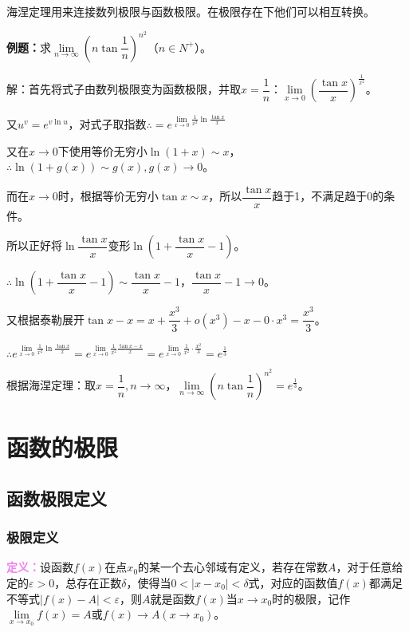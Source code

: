\documentclass[UTF8, 12pt]{ctexart}
\begin{document}
海涅定理用来连接数列极限与函数极限。在极限存在下他们可以相互转换。

\textbf{例题：}求$\lim\limits_{n\to\infty}\left(n\tan\dfrac{1}{n}\right)^{n^2}$（$n\in N^+$）。

解：首先将式子由数列极限变为函数极限，并取$x=\dfrac{1}{n}$：$\lim\limits_{x\to 0}\left(\dfrac{\tan x}{x}\right)^{\frac{1}{x^2}}$。

又$u^v=e^{v\ln u}$，对式子取指数$\therefore =e^{\lim\limits_{x\to 0}\frac{1}{x^2}\ln\frac{\tan x}{x}}$

又在$x\to 0$下使用等价无穷小$\ln (1+x)\sim x$，$\therefore \ln(1+g(x))\sim g(x),g(x)\to 0$。

而在$x\to 0$时，根据等价无穷小$\tan x\sim x$，所以$\dfrac{\tan x}{x}$趋于1，不满足趋于0的条件。

所以正好将$\ln\dfrac{\tan x}{x}$变形$\ln\left(1+\dfrac{\tan x}{x}-1\right)$。

$\therefore \ln\left(1+\dfrac{\tan x}{x}-1\right)\sim\dfrac{\tan x}{x}-1$，$\dfrac{\tan x}{x}-1\to 0$。

又根据泰勒展开$\tan x-x=x+\dfrac{x^3}{3}+o(x^3)-x-0\cdot x^3=\dfrac{x^3}{3}$。

$\therefore e^{\lim\limits_{x\to 0}\frac{1}{x^2}\ln\frac{\tan x}{x}}=e^{\lim\limits_{x\to 0}\frac{1}{x^2}\frac{\tan x-x}{x}}=e^{\lim\limits_{x\to 0}\frac{1}{x^2}\cdot\frac{x^2}{3}}=e^{\frac{1}{3}}$

根据海涅定理：取$x=\dfrac{1}{n},n\to\infty$，$\lim\limits_{n\to\infty}\left(n\tan\dfrac{1}{n}\right)^{n^2}=e^{\frac{1}{3}}$。

\section{函数的极限}

\subsection{函数极限定义}

\subsubsection{极限定义}

\textcolor{violet}{\textbf{定义：}}设函数$f(x)$在点$x_0$的某一个去心邻域有定义，若存在常数$A$，对于任意给定的$\varepsilon>0$，总存在正数$\delta$，使得当$0<\vert x-x_0\vert<\delta$式，对应的函数值$f(x)$都满足不等式$\vert f(x)-A\vert <\varepsilon$，则$A$就是函数$f(x)$当$x\to x_0$时的极限，记作$\lim\limits_{x\to x_0}f(x)=A$或$f(x)\rightarrow A(x\rightarrow x_0)$。
\end{document}

